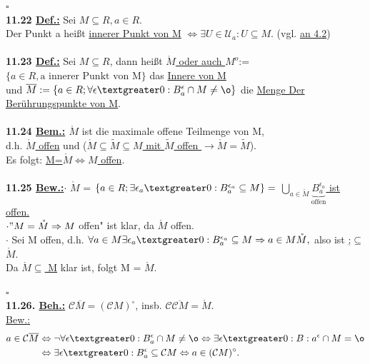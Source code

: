 \documentclass[]{scrartcl}
\begin{document}
	\hfill$\square$\\
	\textbf{11.22 \underline{Def.:}} Sei $M \subseteq R, a\in R.$\\
	Der Punkt a heißt \ul{innerer Punkt von M} $\Leftrightarrow \exists U \in \mathcal{U}_a:U\subseteq M.$ (vgl.  \ul{an 4.2})\\
	\\
	\textbf{11.23 \underline{Def.:}} Sei $M \subseteq R$, dann heißt  \ul{$\mathring{M}$ oder auch $M^o$}:=$\{a\in R,\text{a innerer Punkt von M}\}$ das \ul{Innere von M}\\
	und $\overline{M}:=\{a\in R; \forall \epsilon \textgreater 0: B_a^\epsilon \cap M \neq\o\}$ die \ul{Menge Der Berührungspunkte von M}.\\
	\\
	\textbf{11.24 \underline{Bem.:} $\mathring{M}$} ist die maximale offene Teilmenge von M,\\
	d.h. \ul{$\mathring{M}$ offen} und (\ul{$\mathring{M}\subseteq \tilde{M}\subseteq M$ mit $\tilde{M}$ offen $\rightarrow\mathring{M}=\tilde{M}$}).\\
	Es folgt: \ul{M=$\mathring{M} \Leftrightarrow M$ offen}.\\
	\\
	\textbf{11.25 \underline{Bew.:}}$\cdot$ \ul{$\mathring{M}$} = 
	$\{a\in R ; \exists \epsilon_{a}\textgreater 0:B_a^{\epsilon_{a}}\subseteq M\}=$ \ul{$\bigcup_{a\in \mathring{M}}\underbrace{B_a^{\epsilon_{a}}}_{\text{offen}}$ ist offen.}\\
	$\cdot"M=\mathring{M}\Rightarrow M$ offen" ist klar, da $\mathring{M}$ offen.\\
	$\cdot$ Sei M offen, d.h. $\forall a \in M \exists \epsilon_{a}\textgreater 0: B_a^{\epsilon_{a}}\subseteq M \Rightarrow a \in M\mathring{M},$ also ist \ul{;$\subseteq$ $\mathring{M}$}.\\
	Da \ul{$\mathring{M}\subseteq$ M} klar ist, folgt M = $\mathring{M}$.\\
	\strut\hfill$\square$\\
	\textbf{11.26. \underline{Beh.:}}  \ul{$\mathcal{C}\overline{M}=(\mathcal{C}M)^\circ$}, insb. \ul{$\mathcal{C}\overline{\mathcal{C}M}=\mathring{M}$}.\\
	\underline{Bew.:} \begin{align}
		a\in \mathcal{C} \overline{M} &\Leftrightarrow \neg \forall \epsilon \textgreater 0: B_a^\epsilon \cap M \neq \o \Leftrightarrow \exists \epsilon \textgreater 0: B:a^\epsilon \cap M = \o\\
		&\Leftrightarrow \exists \epsilon \textgreater 0: B_a^\epsilon \subseteq \mathcal{C}M\Leftrightarrow a \in (\mathcal{C}M)^\circ.
	\end{align}\\
\end{document}
